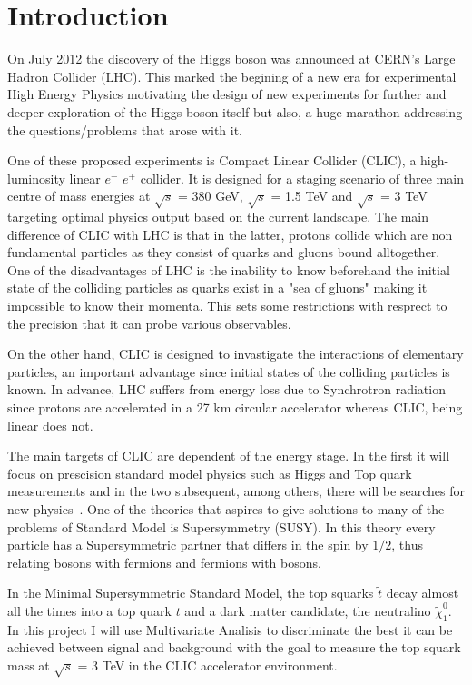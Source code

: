 \documentclass[12pt,a4paper]{report}
\begin{document}

\chapter{Introduction}

On July 2012 the discovery of the Higgs boson was announced at CERN's Large Hadron Collider (LHC). This marked the begining of a new era for experimental High Energy Physics motivating the design of new 
experiments for further and deeper exploration of the Higgs boson itself but also, a huge marathon
addressing the questions/problems that arose with it. 

One of these proposed experiments is Compact Linear Collider (CLIC), a high-luminosity linear $e^{-}$ $e^{+}$ collider. It is designed for a staging scenario of three main centre of mass energies at $\surd{s}$ = 380 GeV, $\surd{s}$ = 1.5 TeV
and $\surd{s}$ = 3 TeV targeting optimal physics output based on the current landscape. The main difference of CLIC with LHC is that in the latter, protons collide which are non fundamental particles as they consist of quarks and 
gluons bound alltogether. One of the disadvantages of LHC is the inability to know beforehand the initial state of the colliding particles as quarks exist in a "sea of gluons" making it impossible to know their momenta. This sets
some restrictions with resprect to the precision that it can probe various observables.

On the other hand, CLIC is designed to invastigate the interactions of elementary particles, an important advantage since initial states of the colliding particles is known. In advance, LHC suffers from energy loss due to 
Synchrotron radiation since protons are accelerated in a 27 km circular accelerator whereas CLIC, being linear does not.

The main targets of CLIC are dependent of the energy stage. In the first it will focus on prescision standard model physics such as Higgs and Top quark measurements and in the two subsequent, among others, there will be searches
for new physics~\cite{clic2016updated}. One of the theories that aspires to give solutions to many of the problems of Standard Model is Supersymmetry (SUSY). In this theory every particle has a Supersymmetric partner that differs in the spin by $1/2$, thus 
relating bosons with fermions and fermions with bosons.

In the Minimal Supersymmetric Standard Model, the top squarks $\tilde{t}$ decay almost all the times into a top quark $t$
and a dark matter candidate, the neutralino $\tilde{\chi}_{1}^{0}$. In this project I will use Multivariate Analisis
to discriminate the best it can be achieved between signal and background with the goal to measure the top squark
mass at $\surd{s}$ = 3 TeV in the CLIC accelerator environment.
\end{document}
